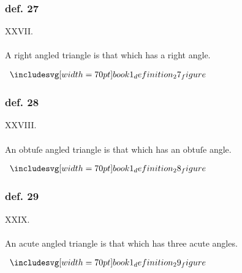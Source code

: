 \hfill

\begin{minipage}{0.67\textwidth}
    \subsubsection{def. 27}
    \begin{center}
        XXVII.\label{book1def27}\\
        \hfill\\
        A right angled triangle is that which has a right angle.
    \end{center}
\end{minipage}%
\begin{minipage}{0.33\textwidth}
    \begin{center}
        $\img[0][0][70]{book1_definition_27_figure}$
    \end{center}
\end{minipage}

\hfill

\begin{minipage}{0.67\textwidth}
    \subsubsection{def. 28}
    \begin{center}
        XXVIII.\label{book1def28}\\
        \hfill\\
        An obtuſe angled triangle is that which has an obtuſe angle.
    \end{center}
\end{minipage}%
\begin{minipage}{0.33\textwidth}
    \begin{center}
        $\img[0][0][70]{book1_definition_28_figure}$
    \end{center}
\end{minipage}

\hfill

\begin{minipage}{0.67\textwidth}
    \subsubsection{def. 29}
    \begin{center}
        XXIX.\label{book1def29}\\
        \hfill\\
        An acute angled triangle is that which has three acute angles.
    \end{center}
\end{minipage}%
\begin{minipage}{0.33\textwidth}
    \begin{center}
        $\img[0][0][70]{book1_definition_29_figure}$
    \end{center}
\end{minipage}

